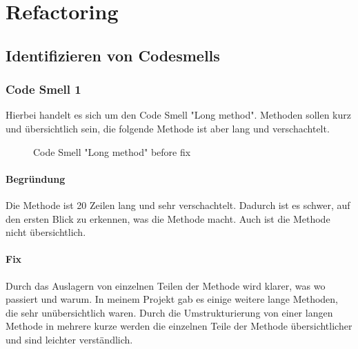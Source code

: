 
\chapter{Refactoring}
\label{refactoring}

\section{Identifizieren von Codesmells}

    \subsection{Code Smell 1}
    Hierbei handelt es sich um den Code Smell "Long method". Methoden sollen kurz und übersichtlich sein, die folgende Methode ist aber lang und verschachtelt.
    
    \begin{figure}[h]
	    \centering
	    \caption{Code Smell "Long method" before fix}
	    \label{a.2.cleanArchitecture}
    \end{figure}
    
    
        \subsubsection{Begründung}
        Die Methode ist 20 Zeilen lang und sehr verschachtelt. Dadurch ist es schwer, auf den ersten Blick zu erkennen, was die Methode macht. Auch ist die Methode nicht übersichtlich.

        \subsubsection{Fix}
        Durch das Auslagern von einzelnen Teilen der Methode wird klarer, was wo passiert und warum. In meinem Projekt gab es einige weitere lange Methoden, die sehr unübersichtlich waren. Durch die Umstrukturierung von einer langen Methode in mehrere kurze werden die einzelnen Teile der Methode übersichtlicher und sind leichter verständlich.
    
